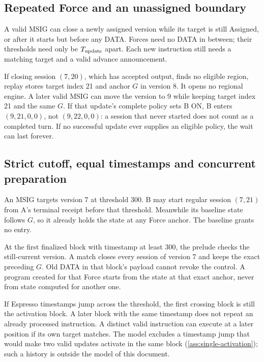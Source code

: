 \documentclass[11pt,a4paper]{article}
\begin{document}
\subsection{Repeated Force and an unassigned boundary}
\label{sec:repeated-force}
A valid MSIG can close a newly assigned version while its target is
still Assigned, or after it starts but before any DATA. Forces need no DATA
in between; their thresholds need only be $T_{\rm update}$ apart. Each
new instruction still needs a matching
target and a valid advance announcement.

If closing session $(7,20)$, which has accepted output, finds no eligible
region, replay stores target index 21 and anchor $G$ in version 8. It
opens no regional engine. A later valid MSIG can move the version to 9
while keeping target index 21 and the same $G$. If that update's complete
policy sets B ON, B enters $(9,21,0,0)$, not $(9,22,0,0)$: a session that
never started does not count as a completed turn. If no successful update
ever supplies an eligible policy, the wait can last forever.

\subsection{Strict cutoff, equal timestamps and concurrent preparation}
\label{sec:cutoff-example}
An MSIG targets version 7 at threshold 300. B may start regular session
$(7,21)$ from A's terminal receipt before that threshold. Meanwhile its
baseline state follows $G$, so it already holds the state at any Force
anchor. The baseline grants no entry.

At the first finalized block with timestamp at least 300, the prelude
checks the still-current version. A match closes every session of
version 7 and keeps the exact preceding $G$. Old DATA in that block's
payload cannot revoke the control. A program created for that
Force starts from the state at that exact anchor, never from state
computed for another one.

If Espresso timestamps jump across the threshold, the first crossing
block is still the activation block. A later block with the same
timestamp does not repeat an already processed instruction. A distinct
valid instruction can execute at a later position if its own target
matches. The model excludes a timestamp jump that would make two valid
updates activate in the same block (\cref{ass:single-activation}); such a
history is outside the model of this document.
\end{document}
